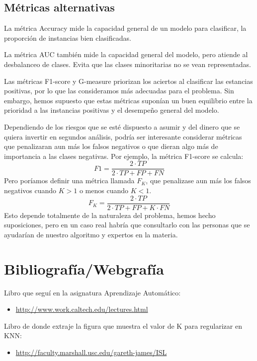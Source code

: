 \documentclass{article}
\begin{document}
\subsection{Métricas alternativas}

La métrica Accuracy mide la capacidad general de un modelo para
clasificar, la proporción de instancias bien clasificadas.

La métrica AUC también mide la capacidad general del modelo, pero
atiende al desbalanceo de clases. Evita que las clases minoritarias no
se vean representadas.

Las métricas F1-score y G-measure priorizan los aciertos al clasificar
las estancias positivas, por lo que las consideramos más adecuadas
para el problema. Sin embargo, hemos supuesto que estas métricas
suponían un buen equilibrio entre la prioridad a las instancias
positivas y el desempeño general del modelo.

Dependiendo de los riesgos que se esté dispuesto a asumir y del dinero
que se quiera invertir en segundos análisis, podría ser interesante
considerar métricas que penalizaran aun más los falsos negativos o que
dieran algo más de importancia a las clases negativas. Por ejemplo, la
métrica F1-score se calcula:
\[F1=\frac{2\cdot TP}{2\cdot TP+FP+FN}\] Pero poríamos definir una
métrica llamada $F_K$, que penalizase aun más los falsos negativos
cuando $K>1$ o menos cuando $K<1$.
\[F_K=\frac{2\cdot TP}{2\cdot TP+FP+K\cdot FN}\] Esto depende
totalmente de la naturaleza del problema, hemos hecho suposiciones,
pero en un caso real habría que consultarlo con las personas que se
ayudarían de nuestro algoritmo y expertos en la materia.

\section{Bibliografía/Webgrafía}

Libro que seguí en la asignatura Aprendizaje Automático:
\begin{itemize}
\item \href{http://www.work.caltech.edu/lectures.html}{http://www.work.caltech.edu/lectures.html}
\end{itemize}

Libro de donde extraje la figura que muestra el valor de K para
regularizar en KNN:
\begin{itemize}
\item \href{http://faculty.marshall.usc.edu/gareth-james/ISL}{http://faculty.marshall.usc.edu/gareth-james/ISL}
\end{itemize}
\end{document}
